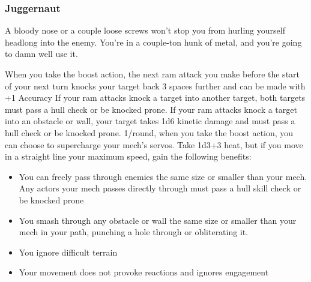 \subsubsection{Juggernaut}

\begin{talent}
{A bloody nose or a couple loose screws won’t stop you from hurling yourself headlong into the enemy. You’re in a couple-ton hunk of metal, and you’re going to damn well use it.}

When you take the boost action, the next ram attack you make before the start of your next turn knocks your target back 3 spaces further and can be made with +1 Accuracy
If your ram attacks knock a target into another target, both targets must pass a hull check or be knocked prone. If your ram attacks knock a target into an obstacle or wall, your target takes 1d6 kinetic damage and must pass a hull check or be knocked prone.
1/round, when you take the boost action, you can choose to supercharge your mech’s servos. Take 1d3+3 heat, but if you move in a straight line your maximum speed, gain the following benefits: 
\begin{itemize}
\item You can freely pass through enemies the same size or smaller than your mech. Any actors your mech passes directly through must pass a hull skill check or be knocked prone 
\item You smash through any obstacle or wall the same size or smaller than your mech
in your path, punching a hole through or obliterating it.
\item You ignore difficult terrain
\item Your movement does not provoke reactions and ignores engagement
\end{itemize}
\end{talent}